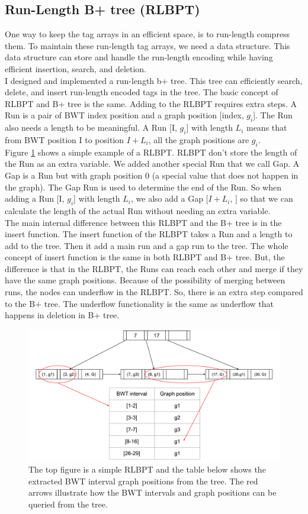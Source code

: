 \documentclass[11pt]{ucthesis}
\begin{document}
\subsection{Run-Length B+ tree (RLBPT)}
One way to keep the tag arrays in an efficient space, is to run-length compress them. To maintain these run-length tag arrays, we need a data structure. This data structure can store and handle the run-length encoding while having efficient insertion, search, and deletion. \\
I designed and implemented a run-length b+ tree. This tree can efficiently search, delete, and insert run-length encoded tags in the tree. The basic concept of RLBPT and B+ tree is the same. Adding to the RLBPT requires extra steps. A Run is a pair of BWT index position and a graph position [index, $g_i$]. The Run also needs a length to be meaningful. A Run [I, $g_i$] with length $L_i$ means that from BWT position I to position $I + L_i$, all the graph positions are $g_i$.\\ 
Figure \ref{fig:2:5} shows a simple example of a RLBPT. RLBPT don't store the length of the Run as an extra variable. We added another special Run that we call Gap. A Gap is a Run but with graph position 0 (a special value that does not happen in the graph). The Gap Run is used to determine the end of the Run. So when adding a Run [I, $g_i$]  with length $L_i$, we also add a Gap [$I + L_i$, ] so that we can calculate the length of the actual Run without needing an extra variable. \\
The main internal difference between this RLBPT and the B+ tree is in the insert function. The insert function of the RLBPT takes a Run and a length to add to the tree. Then it add a main run and a gap run to the tree. The whole concept of insert function is the same in both RLBPT and B+ tree. But, the difference is that in the RLBPT, the Runs can reach each other and merge if they have the same graph positions.
Because of the possibility of merging between runs, the nodes can underflow in the RLBPT. So, there is an extra step compared to the B+ tree. The underflow functionality is the same as underflow that happens in deletion in B+ tree. 
\begin{figure}[h]
    \centering
    \includegraphics[width=\linewidth]{Images/RLBPT.pdf}
    \caption[Run-length B+ tree]{The top figure is a simple RLBPT and the table below shows the extracted BWT interval graph positions from the tree. The red arrows illustrate how the BWT intervals and graph positions can be queried from the tree. }
    \label{fig:2:5}
\end{figure}
\end{document}
